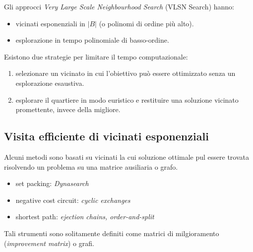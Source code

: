 \documentclass{article}
\begin{document}
Gli approcci \textit{Very Large Scale Neighbourhood Search} (VLSN Search) hanno:
\begin{itemize}
    \item vicinati esponenziali in $|B|$ (o polinomi di ordine più alto).
    \item esplorazione in tempo polinomiale di basso-ordine.
\end{itemize}
Esistono due strategie per limitare il tempo computazionale:
\begin{enumerate}
    \item selezionare un vicinato in cui l'obiettivo può essere ottimizzato senza un esplorazione
    esaustiva.
    \item esplorare il quartiere in modo euristico e restituire una soluzione vicinato
    promettente, invece della migliore.
\end{enumerate}
\subsection{Visita efficiente di vicinati esponenziali}
Alcuni metodi sono basati su vicinati la cui soluzione ottimale pul essere trovata risolvendo un problema su una
matrice ausiliaria o grafo.
\begin{itemize}
    \item set packing: \textit{Dynasearch}
    \item negative cost circuit: \textit{cyclic exchanges}
    \item shortest path: \textit{ejection chains, order-and-split}
\end{itemize}
Tali strumenti sono solitamente definiti come matrici di milgioramento (\textit{improvement matrix})
o grafi.
\end{document}

